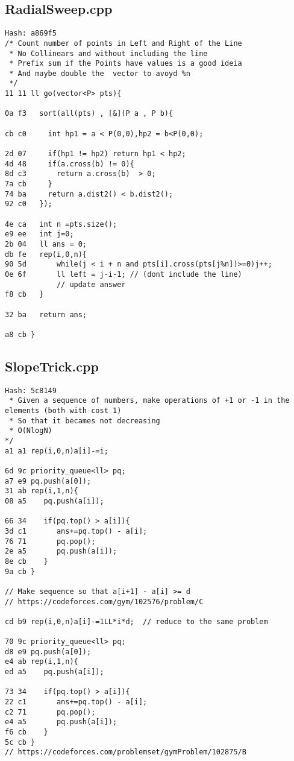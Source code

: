 \documentclass[11pt, a4paper, twoside]{article}
\begin{document}
\subsection{RadialSweep.cpp}
\begin{lstlisting}
Hash: a869f5
/* Count number of points in Left and Right of the Line
 * No Collinears and without including the line
 * Prefix sum if the Points have values is a good ideia
 * And maybe double the  vector to avoyd %n
 */
11 11 ll go(vector<P> pts){
      
0a f3   sort(all(pts) , [&](P a , P b){
          
cb c0     int hp1 = a < P(0,0),hp2 = b<P(0,0);
      
2d 07     if(hp1 != hp2) return hp1 < hp2;
4d 48     if(a.cross(b) != 0){
8d c3       return a.cross(b)  > 0;
7a cb     }
74 ba     return a.dist2() < b.dist2();
92 c0   });
      
4e ca   int n =pts.size();
e9 ee   int j=0;
2b 04   ll ans = 0;
db fe   rep(i,0,n){
90 5d       while(j < i + n and pts[i].cross(pts[j%n])>=0)j++;
0e 6f       ll left = j-i-1; // (dont include the line)
            // update answer
f8 cb   }
      
32 ba   return ans;
      
a8 cb }
\end{lstlisting}

\subsection{SlopeTrick.cpp}
\begin{lstlisting}
Hash: 5c8149
 * Given a sequence of numbers, make operations of +1 or -1 in the elements (both with cost 1)
 * So that it becames not decreasing
 * O(NlogN)
*/
a1 a1 rep(i,0,n)a[i]-=i;  
  
6d 9c priority_queue<ll> pq;
a7 e9 pq.push(a[0]);
31 ab rep(i,1,n){
08 a5    pq.push(a[i]);
          
66 34    if(pq.top() > a[i]){
3d c1       ans+=pq.top() - a[i];
76 71       pq.pop();
2e a5       pq.push(a[i]);
8e cb    }
9a cb }

// Make sequence so that a[i+1] - a[i] >= d
// https://codeforces.com/gym/102576/problem/C

cd b9 rep(i,0,n)a[i]-=1LL*i*d;  // reduce to the same problem
  
70 9c priority_queue<ll> pq;
d8 e9 pq.push(a[0]);
e4 ab rep(i,1,n){
ed a5    pq.push(a[i]);
          
73 34    if(pq.top() > a[i]){
22 c1       ans+=pq.top() - a[i];
c2 71       pq.pop();
e4 a5       pq.push(a[i]);
f6 cb    }
5c cb }
// https://codeforces.com/problemset/gymProblem/102875/B
\end{lstlisting}
\end{document}
